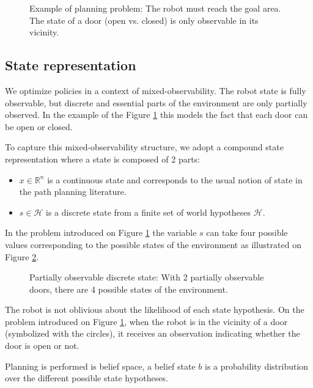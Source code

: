 \documentclass[letterpaper, 10 pt, conference]{ieeeconf}  %
\begin{document}
\begin{figure}[!htb]
 \caption{Example of planning problem: The robot must reach the goal area. The state of a door (open vs. closed) is only observable in its vicinity. }
 \label{fig:problem}
\end{figure}

\subsection{State representation}
We optimize policies in a context of mixed-observability. The robot state is fully observable, but discrete and essential parts of the environment are only partially observed. In the example of the Figure \ref{fig:problem} this models the fact that each door can be open or closed.
 
To capture this mixed-observability structure, we adopt a compound state representation where a state is composed of 2 parts:
\begin{itemize}
\item $x \in \mathbb{R}^n$ is a continuous state and corresponds to the usual notion of state in the path planning literature.
\item $s \in \mathcal{H}$ is a discrete state from a finite set of world hypotheses $\mathcal{H}$.
\end{itemize}

In the problem introduced on Figure \ref{fig:problem} the variable $s$ can take four possible values corresponding to the possible states of the environment as illustrated on Figure \ref{fig:multiple_worlds}.

\begin{figure}[!htb]
 \caption{Partially observable discrete state: With 2 partially observable doors, there are 4 possible states of the environment.}
 \label{fig:multiple_worlds}
\end{figure}

The robot is not oblivious about the likelihood of each state hypothesis. On the problem introduced on Figure \ref{fig:problem}, when the robot is in the vicinity of a door (symbolized with the circles), it receives an observation indicating whether the door is open or not.

Planning is performed is belief space, a belief state $b$ is a probability distribution over the different possible state hypotheses.
\end{document}
